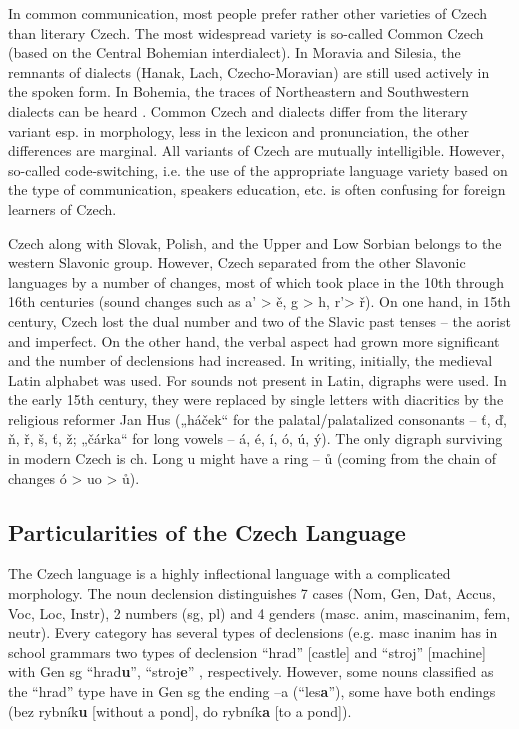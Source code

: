 \begin{multicols}{2}
In common communication, most people prefer rather other varieties of Czech than literary Czech. The most widespread variety is so-called Common Czech (based on the Central Bohemian interdialect). In Moravia and Silesia, the remnants of dialects (Hanak, Lach, Czecho-Moravian) are still used actively in the spoken form. In Bohemia, the traces of Northeastern and Southwestern dialects can be heard \cite{Note3}. Common Czech and dialects differ from the literary variant esp. in morphology, less in the lexicon and pronunciation, the other differences are marginal. All variants of Czech are mutually intelligible. However, so-called code-switching, i.e. the use of the appropriate language variety based on the type of communication, speakers education, etc. is often confusing for foreign learners of Czech.

Czech along with Slovak, Polish, and the Upper and Low Sorbian belongs to the western Slavonic group. However, Czech separated from the other Slavonic languages by a number of changes, most of which took place in the 10th through 16th centuries (sound changes such as a’ > ě, g > h, r’> ř). On one hand, in 15th century, Czech lost the dual number and two of the Slavic past tenses – the aorist and imperfect. On the other hand, the verbal aspect had grown more significant and the number of declensions had increased. In writing, initially, the medieval Latin alphabet was used. For sounds not present in Latin, digraphs were used. In the early 15th century, they were replaced by single letters with diacritics by the religious reformer Jan Hus („háček“ for the palatal/palatalized consonants – ť, ď, ň, ř, š, ť, ž; „čárka“ for long vowels – á, é, í, ó, ú, ý). The only digraph surviving in modern Czech is ch. Long u might have a ring – ů (coming from the chain of changes ó > uo > ů).
 
\subsection{Particularities of the Czech Language }

The Czech language is a highly inflectional language with a complicated morphology. The noun declension distinguishes 7 cases (Nom, Gen, Dat, Accus, Voc, Loc, Instr), 2 numbers (sg, pl) and 4 genders (masc. anim, mascinanim, fem, neutr). Every category has several types of declensions (e.g. masc inanim has in school grammars two types of declension “hrad” {[}castle{]} and “stroj” {[}machine{]} with Gen sg “hrad\textbf{u}”, “stroj\textbf{e}” , respectively. However, some nouns classified as the “hrad” type have in Gen sg the ending –a (“les\textbf{a}”), some have both endings (bez rybník\textbf{u} {[}without a pond{]}, do rybník\textbf{a} {[}to a pond{]}).


\end{multicols}
